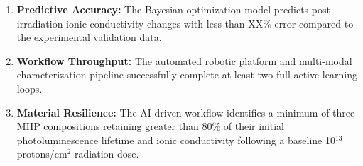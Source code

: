 \documentclass[pgs]{DOE}
\begin{document}
\begin{enumerate}
    \item \textbf{Predictive Accuracy:} The Bayesian optimization model predicts post-irradiation ionic conductivity changes with less than XX\% error compared to the experimental validation data.
    \item \textbf{Workflow Throughput:} The automated robotic platform and multi-modal characterization pipeline successfully complete at least two full active learning loops. 
    \item \textbf{Material Resilience:} The AI-driven workflow identifies a minimum of three MHP compositions retaining greater than 80\% of their initial photoluminescence lifetime and ionic conductivity following a baseline 10$^{13}$ protons/cm$^2$ radiation dose.
\end{enumerate}



\end{document}
